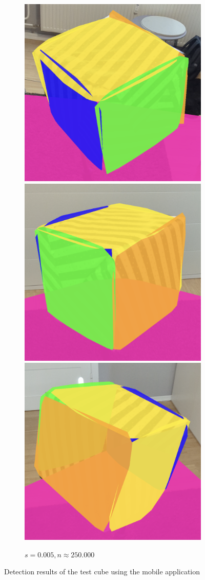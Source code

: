 \begin{figure}[h!tbp]
    \begin{subfigure}[b]{\textwidth}
        \centering
        \includegraphics[width=0.3\linewidth]{images/cube_005_1}
        \includegraphics[width=0.3\linewidth]{images/cube_005_2}
        \includegraphics[width=0.3\linewidth]{images/cube_005_3}
        \caption{$s=0.005, n\approx250.000$}
    \end{subfigure}%

    \caption{Detection results of the test cube using the mobile application}
    \label{fig:cube-results}
\end{figure}

